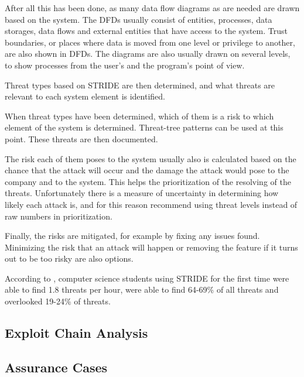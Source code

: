 After all this has been done, as many data flow diagrams as are needed are drawn based on the system. \cite{microsoft_security_lifecycle}
The DFDs usually consist of entities, processes, data storages, data flows and external entities that have access to the system. 
Trust boundaries, or places where data is moved from one level or privilege to another, are also shown in DFDs.
The diagrams are also usually drawn on several levels, to show processes from the user's and the program's point of view.

Threat types based on STRIDE are then determined, and what threats are relevant to each system element is identified.

When threat types have been determined, which of them is a risk to which element of the system is determined. \cite{microsoft_security_lifecycle}
Threat-tree patterns can be used at this point.
These threats are then documented.

The risk each of them poses to the system usually also is calculated based on the chance that the attack will occur and the damage the attack would pose to the company and to the system. \cite{microsoft_security_lifecycle}
This helps the prioritization of the resolving of the threats. 
Unfortunately there is a measure of uncertainty in determining how likely each attack is, and for this reason \citet{microsoft_security_lifecycle} recommend using threat levels instead of raw numbers in prioritization. 

Finally, the risks are mitigated, for example by fixing any issues found.
Minimizing the risk that an attack will happen or removing the feature if it turns out to be too risky are also options.

According to \citet{stride_effectiveness}, computer science students using STRIDE for the first time were able to find 1.8 threats per hour, were able to find 64-69\% of all threats and overlooked 19-24\% of threats.

\subsection{Exploit Chain Analysis}


\subsection{Assurance Cases}


